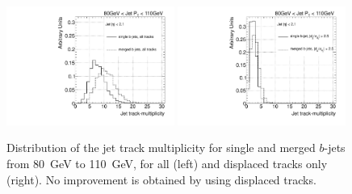 \begin{figure}[tp]
\centering
\includegraphics[width=0.49\textwidth]{FIGS/TEMPFigs/DisplacedTracks/Ntrk_alltracksW080.pdf}
\includegraphics[width=0.49\textwidth]{FIGS/TEMPFigs/DisplacedTracks/Ntrk_displacedW080.pdf}
\caption{Distribution of the jet track multiplicity for single and merged $b$-jets from 80~GeV to 110~GeV, for all (left) and displaced tracks only (right). No improvement is obtained by using displaced tracks.}
\label{fig:displacedntrk}
\end{figure}






